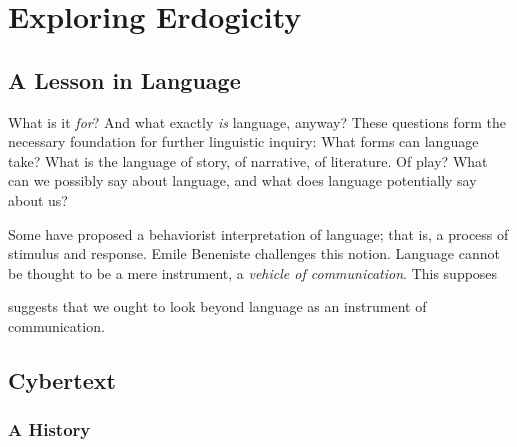 \documentclass[10pt,twoside,twocolumn,openany,nomultitoc]{book}
\begin{document}


\chapter{Exploring Erdogicity} 
\section{A Lesson in Language}\vspace{2pt}
      What is it \textit{for}?
     And what exactly \textit{is} language, anyway? These questions form the necessary foundation for further linguistic inquiry: What forms can language take? What is the language of story, of narrative, of literature. Of play? What can we possibly say about language, and what does language potentially say about us?
     
     Some have proposed a behaviorist interpretation of language; that is, a process of stimulus and response. Emile Beneniste challenges this notion. Language cannot be thought to be a mere instrument, a \textit{vehicle of communication}\cite{}. This supposes 
     
     suggests that we ought to look beyond language as an instrument of communication.   

\section{Cybertext}\vspace{2pt}
\subsection{A History}
    \lipsum[2]
\end{document}
